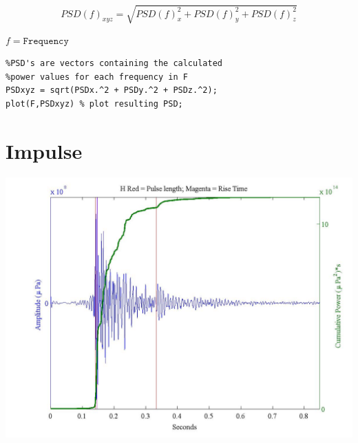 \documentclass[11pt]{report}
\begin{document}
$$PSD(f)_{xyz} = \sqrt{PSD(f)_x^2 + PSD(f)_y^2 + PSD(f)_z^2}$$

\begin{flushright}
$f = \mathtt{Frequency}$
\end{flushright}

\begin{lstlisting}
%PSD's are vectors containing the calculated
%power values for each frequency in F
PSDxyz = sqrt(PSDx.^2 + PSDy.^2 + PSDz.^2);
plot(F,PSDxyz) % plot resulting PSD;
\end{lstlisting}

\section{Impulse}

\begin{center}
\includegraphics[width = \textwidth ]{8.jpeg}
\end{center}
\end{document}
